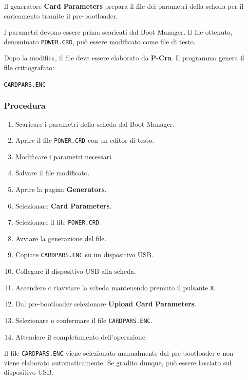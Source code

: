 \documentclass[11pt,a4paper]{article}
\newcommand{\software}{\textbf{P-Cra}}
\newcommand{\button}[1]{\textbf{#1}}
\newcommand{\filename}[1]{\texttt{#1}}
\begin{document}
Il generatore \button{Card Parameters} prepara il file dei parametri
della scheda per il caricamento tramite il pre-bootloader.

I parametri devono essere prima scaricati dal Boot Manager. Il file
ottenuto, denominato \filename{POWER.CRD}, può essere modificato
come file di testo.

Dopo la modifica, il file deve essere elaborato da \software{}.
Il programma genera il file crittografato:

\begin{center}
    \filename{CARDPARS.ENC}
\end{center}

\subsubsection*{Procedura}

\begin{enumerate}
    \item Scaricare i parametri della scheda dal Boot Manager.
    \item Aprire il file \filename{POWER.CRD} con un editor di testo.
    \item Modificare i parametri necessari.
    \item Salvare il file modificato.
    \item Aprire la pagina \button{Generators}.
    \item Selezionare \button{Card Parameters}.
    \item Selezionare il file \filename{POWER.CRD}.
    \item Avviare la generazione del file.
    \item Copiare \filename{CARDPARS.ENC} su un dispositivo USB.
    \item Collegare il dispositivo USB alla scheda.
    \item Accendere o riavviare la scheda mantenendo premuto
    il pulsante \texttt{X}.
    \item Dal pre-bootloader selezionare \button{Upload Card Parameters}.
    \item Selezionare o confermare il file \filename{CARDPARS.ENC}.
    \item Attendere il completamento dell'operazione.
\end{enumerate}

Il file \filename{CARDPARS.ENC} viene selezionato manualmente
dal pre-bootloader e non viene elaborato automaticamente. Se gradito dunque,
può essere lasciato sul dispositivo USB.
\end{document}
